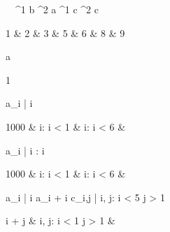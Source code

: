 \begin{eqcode}{\mu}{\ }{\ }{^1}
  b ^2 \lend
  a \in {}^1 \lend
  c \in {}^2 \lend
  c \gets \begin{tmatrix}
    1 & 2 & 3  & 5 & 6  & 8 & 9 \lend
  \end{tmatrix} \lend
  a \gets 
  \begin{tmatrix}
    1   \lend
\end{tmatrix} \lend
  a_i | \forall i \gets 
  \begin{cases}
    1000 & i: i < 1  & i: i < 6  & \otherwise \lend
  \end{cases}\lend

  a_i | i : i  \gets
  \begin{cases}
    1000 & i: i < 1  & i: i < 6  & \otherwise \lend
  \end{cases}\lend

  a_i | \forall i \gets a_i  + i \lend
  c_{i,j} | i, j: i < 5 \cap j > 1 \gets 
  \begin{cases}
    i + j & i, j: i < 1 \cap j > 1  & \otherwise \lend
  \end{cases} \lend
   \lend
\end{eqcode}
